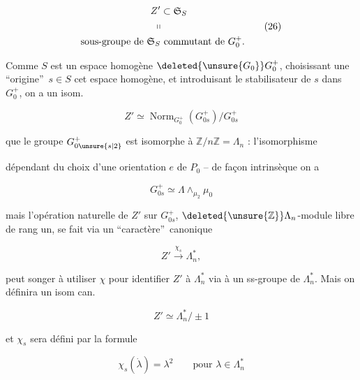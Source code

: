 \[
\begin{aligned}
 Z'&\subset\mathfrak S_S\\
 \shortparallel&\\
 \text{sous-groupe de }\mathfrak S_S&\text{ commutant de }G_0^+.
\end{aligned}\tag*{(26)}
\]


Comme $S$ est un espace homogène  $\deleted{\unsure{G_0}}G_0^+$, choisissant une ``origine''\ $s\in S$  cet espace homogène, et introduisant le stabilisateur de $s$ dans $G_0^+$, on a un isom.

\[
Z'\simeq\operatorname{Norm}_{G_0^+}(G_{0s}^+)/G_{0s}^+\tag*{(27)}
\]

 que  le groupe $G_{0\unsure{s|2}}^+$ est isomorphe à $\mathbb Z/n\mathbb Z=\Lambda_n$  : l'isomorphisme

dépendant du choix d'une orientation $e$ de $P_0$ -- de façon intrinsèque on a

\[
G_{0s}^+\simeq\Lambda\wedge_{\mu_2}\mu_0\tag*{(28)}
\]


mais l'opération naturelle de $Z'$ sur $G_{0s}^+$, $\deleted{\unsure{\mathbb Z}}\Lambda_n$-module libre de rang un, se fait via un ``caractère''\ canonique

\[
Z'\xrightarrow{\chi_s}\Lambda_n^*,\tag*{(29)}
\]

 peut songer à utiliser $\chi$ pour identifier $Z'$ à $\Lambda_n^*$ via à un ss-groupe de $\Lambda_n^*$. Mais  on définira un isom can.

\[
Z'\simeq\Lambda_n^*/\pm1
\]

et $\chi_s$ sera défini par la formule

\[
\chi_s(\dot\lambda)=\lambda^2\qquad\text{pour }\lambda\in\Lambda_n^*\tag*{(30)}
\]


